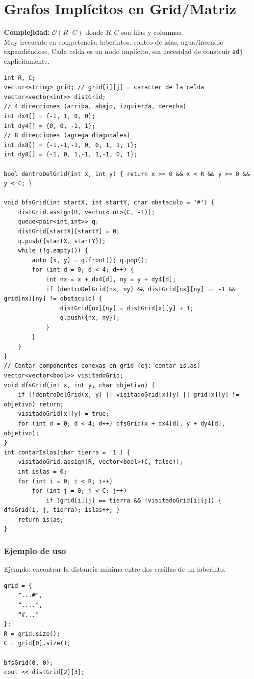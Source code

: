 \documentclass[10pt,twocolumn,letterpaper]{report}
\begin{document}
\section{Grafos Implícitos en Grid/Matriz}
\textbf{Complejidad:} $\mathcal{O}(R \cdot C)$ donde $R, C$ son filas y columnas. \\
Muy frecuente en competencia: laberintos, conteo de islas, agua/incendio expandiéndose. Cada celda es un nodo implícito, sin necesidad de construir \texttt{adj} explícitamente.
\begin{lstlisting}
int R, C;
vector<string> grid; // grid[i][j] = caracter de la celda
vector<vector<int>> distGrid;
// 4 direcciones (arriba, abajo, izquierda, derecha)
int dx4[] = {-1, 1, 0, 0};
int dy4[] = {0, 0, -1, 1};
// 8 direcciones (agrega diagonales)
int dx8[] = {-1,-1,-1, 0, 0, 1, 1, 1};
int dy8[] = {-1, 0, 1,-1, 1,-1, 0, 1};

bool dentroDelGrid(int x, int y) { return x >= 0 && x < R && y >= 0 && y < C; }

void bfsGrid(int startX, int startY, char obstaculo = '#') {
    distGrid.assign(R, vector<int>(C, -1));
    queue<pair<int,int>> q;
    distGrid[startX][startY] = 0;
    q.push({startX, startY});
    while (!q.empty()) {
        auto [x, y] = q.front(); q.pop();
        for (int d = 0; d < 4; d++) {
            int nx = x + dx4[d], ny = y + dy4[d];
            if (dentroDelGrid(nx, ny) && distGrid[nx][ny] == -1 && grid[nx][ny] != obstaculo) {
                distGrid[nx][ny] = distGrid[x][y] + 1;
                q.push({nx, ny});
            }
        }
    }
}
// Contar componentes conexas en grid (ej: contar islas)
vector<vector<bool>> visitadoGrid;
void dfsGrid(int x, int y, char objetivo) {
    if (!dentroDelGrid(x, y) || visitadoGrid[x][y] || grid[x][y] != objetivo) return;
    visitadoGrid[x][y] = true;
    for (int d = 0; d < 4; d++) dfsGrid(x + dx4[d], y + dy4[d], objetivo);
}
int contarIslas(char tierra = '1') {
    visitadoGrid.assign(R, vector<bool>(C, false));
    int islas = 0;
    for (int i = 0; i < R; i++)
        for (int j = 0; j < C; j++)
            if (grid[i][j] == tierra && !visitadoGrid[i][j]) { dfsGrid(i, j, tierra); islas++; }
    return islas;
}
\end{lstlisting}
\subsubsection*{Ejemplo de uso}
Ejemplo: encontrar la distancia mínima entre dos casillas de un laberinto.
\begin{lstlisting}
grid = {
    "...#",
    "....",
    "#..."
};
R = grid.size();
C = grid[0].size();

bfsGrid(0, 0);
cout << distGrid[2][3];
\end{lstlisting}
\end{document}
